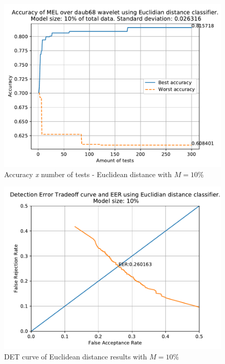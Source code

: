 		
		
		
		
		
		
		
		
		
		

		\begin{figure}[H]
			\centering
			\includegraphics[scale=.8]{images/results/confusionMatrices/classifier_Euclidian_10.pdf}
			\caption{Accuracy \textit{x} number of tests - Euclidean distance with $M=10\%$}
			\label{fig:classifiereuclidian10}
		\end{figure}
		\begin{figure}[H]
			\centering
			\includegraphics[scale=.8]{images/results/det/DET_for_classifier_Euclidian_10.pdf}
			\caption{DET curve of Euclidean distance results with $M=10\%$}
			\label{fig:detforclassifiereuclidian10}
		\end{figure}
	
